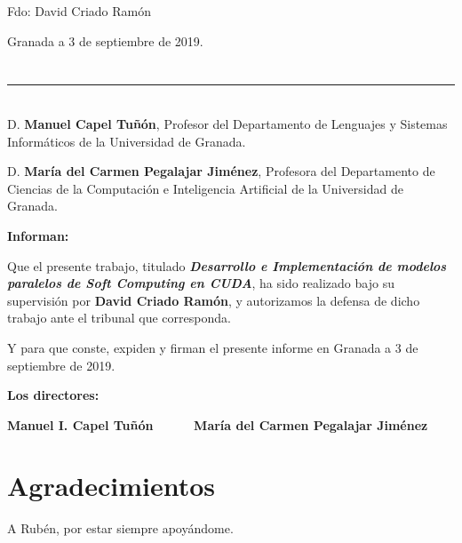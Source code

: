 \vspace{6cm}

\noindent Fdo: David Criado Ramón

\vspace{2cm}

\begin{flushright}
Granada a 3 de septiembre de 2019.
\end{flushright}


\chapter*{}
\thispagestyle{empty}
\noindent\rule[-1ex]{\textwidth}{1pt}\\[4.5ex]
D. \textbf{Manuel Capel Tuñón}, Profesor del Departamento de Lenguajes y Sistemas Informáticos de la Universidad de Granada.

\vspace{0.5cm}

D. \textbf{María del Carmen Pegalajar Jiménez}, Profesora del Departamento de Ciencias de la Computación e Inteligencia Artificial de la Universidad de Granada.


\vspace{0.5cm}

\textbf{Informan:}

\vspace{0.5cm}

Que el presente trabajo, titulado \textit{\textbf{Desarrollo e Implementación de modelos paralelos de Soft Computing en CUDA}},
ha sido realizado bajo su supervisión por \textbf{David Criado Ramón}, y autorizamos la defensa de dicho trabajo ante el tribunal
que corresponda.

\vspace{0.5cm}

Y para que conste, expiden y firman el presente informe en Granada a 3 de septiembre de 2019.

\vspace{1cm}

\textbf{Los directores:}

\vspace{4cm}

\noindent \textbf{Manuel I. Capel Tuñón \ \ \ \ \ María del Carmen Pegalajar Jiménez}

\chapter*{Agradecimientos}
\thispagestyle{empty}

       \vspace{1cm}


A Rubén, por estar siempre apoyándome.